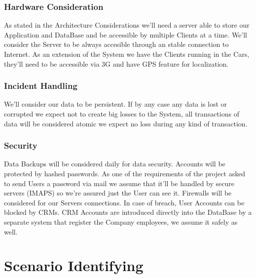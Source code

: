 \documentclass[a4paper]{article}
\begin{document}
\subsubsection{Hardware Consideration}
As stated in the Architecture Considerations we'll need a server able to store our Application and DataBase and be accessible by multiple Clients at a time. We'll consider the Server to be always accesible through an stable connection to Internet. 
As an extension of the System we have the Clients running in the Cars, they'll need to be accessible via 3G and have GPS feature for localization.

\subsubsection{Incident Handling}
We'll consider our data to be persistent. If by any case any data is lost or corrupted we expect not to create big losses to the System, all transactions of data will be considered atomic we expect no loss during any kind of transaction. 

\subsubsection{Security}
Data Backups will be considered daily for data security. Accounts will be protected by hashed passwords. As one of the requirements of the project asked to send Users a password via mail we assume that it'll be handled by secure servers (IMAPS) so we're assured just the User can see it. Firewalls will be considered for our Servers connections. In case of breach, User Accounts can be blocked by CRMs. CRM Accounts are introduced directly into the DataBase by a separate system that register the Company employees, we assume it safely as well.

\section{Scenario Identifying}
\end{document}
